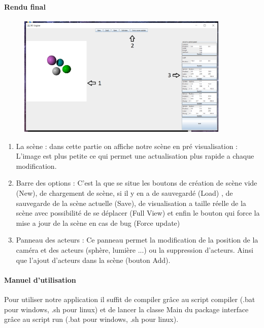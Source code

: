 \documentclass[12pt]{article}
\begin{document}
			\paragraph{Rendu final}
\begin{figure}[h]
			\begin{center}
	    	\includegraphics[width=0.9\textwidth]{./images/Capture.png}
			\end{center}
	\end{figure}
		  	\begin{enumerate}
		      \item La scène : dans cette partie on affiche notre scène en pré visualisation : L'image est plus petite ce qui permet une actualisation plus rapide a chaque modification.
		      \item Barre des options : C'est la que se situe les boutons de création de scène vide (New), de chargement de scène, si il y en a de sauvegardé (Load) , de sauvegarde de la scène actuelle  (Save), de visualisation a taille réelle de la scène avec possibilité de se déplacer (Full View) et enfin le bouton qui force la mise a jour de la scène en cas de bug (Force update)
		      \item Panneau des acteurs : Ce panneau permet la modification de la position de la caméra et des acteurs (sphère, lumière ...) ou la suppression d'acteurs. Ainsi que l'ajout d'acteurs dans la scène (bouton Add).
		  	\end{enumerate}
		  
		  	\paragraph{Manuel d'utilisation}
		  	Pour utiliser notre application il suffit de compiler grâce au script compiler (.bat pour windows, .sh pour linux) et de lancer la classe Main du package interface grâce au script run (.bat pour windows, .sh pour linux).
		  	
\end{document}
